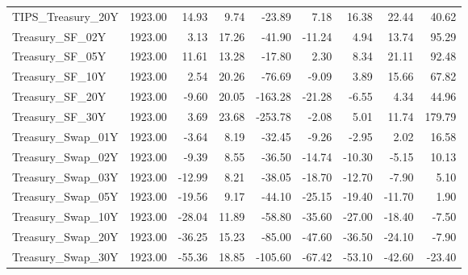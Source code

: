 \begin{table}
\begin{tabular}{lrrrrrrrr}
TIPS_Treasury_20Y & 1923.00 & 14.93 & 9.74 & -23.89 & 7.18 & 16.38 & 22.44 & 40.62 \\
Treasury_SF_02Y & 1923.00 & 3.13 & 17.26 & -41.90 & -11.24 & 4.94 & 13.74 & 95.29 \\
Treasury_SF_05Y & 1923.00 & 11.61 & 13.28 & -17.80 & 2.30 & 8.34 & 21.11 & 92.48 \\
Treasury_SF_10Y & 1923.00 & 2.54 & 20.26 & -76.69 & -9.09 & 3.89 & 15.66 & 67.82 \\
Treasury_SF_20Y & 1923.00 & -9.60 & 20.05 & -163.28 & -21.28 & -6.55 & 4.34 & 44.96 \\
Treasury_SF_30Y & 1923.00 & 3.69 & 23.68 & -253.78 & -2.08 & 5.01 & 11.74 & 179.79 \\
Treasury_Swap_01Y & 1923.00 & -3.64 & 8.19 & -32.45 & -9.26 & -2.95 & 2.02 & 16.58 \\
Treasury_Swap_02Y & 1923.00 & -9.39 & 8.55 & -36.50 & -14.74 & -10.30 & -5.15 & 10.13 \\
Treasury_Swap_03Y & 1923.00 & -12.99 & 8.21 & -38.05 & -18.70 & -12.70 & -7.90 & 5.10 \\
Treasury_Swap_05Y & 1923.00 & -19.56 & 9.17 & -44.10 & -25.15 & -19.40 & -11.70 & 1.90 \\
Treasury_Swap_10Y & 1923.00 & -28.04 & 11.89 & -58.80 & -35.60 & -27.00 & -18.40 & -7.50 \\
Treasury_Swap_20Y & 1923.00 & -36.25 & 15.23 & -85.00 & -47.60 & -36.50 & -24.10 & -7.90 \\
Treasury_Swap_30Y & 1923.00 & -55.36 & 18.85 & -105.60 & -67.42 & -53.10 & -42.60 & -23.40 \\
\bottomrule
\end{tabular}
\end{table}
